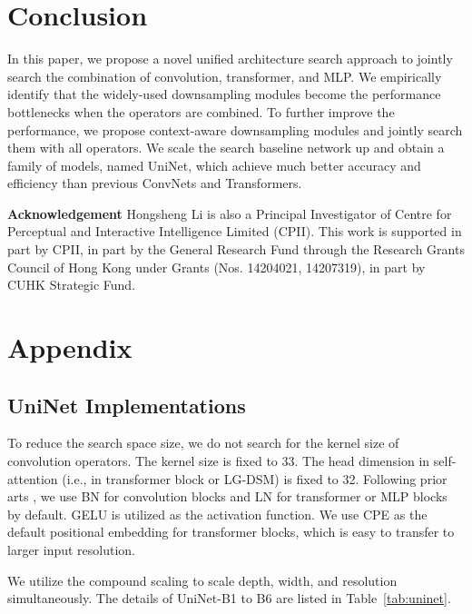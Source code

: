 \documentclass[runningheads]{llncs}
\begin{document}
\section{Conclusion}
\label{conclusion}

In this paper, we propose a novel unified architecture search approach to jointly search the combination of convolution, transformer, and MLP. We empirically identify that the widely-used downsampling modules become the performance bottlenecks when the operators are combined. To further improve the performance, we propose context-aware downsampling modules and jointly search them with all operators. We scale the search baseline network up and obtain a family of models, named UniNet, which achieve much better accuracy and efficiency than previous ConvNets and Transformers.



\textbf{Acknowledgement}
Hongsheng Li is also a Principal Investigator of Centre for Perceptual and Interactive Intelligence Limited (CPII). This work is supported in part by CPII, in part by the General Research Fund through the Research Grants Council of Hong Kong under Grants (Nos. 14204021, 14207319), in part by CUHK Strategic Fund.

\section{Appendix}

\subsection{UniNet Implementations}
To reduce the search space size, we do not search for the kernel size of convolution operators. The kernel size is fixed to 33. The head dimension in self-attention (i.e., in transformer block or LG-DSM) is fixed to 32. Following prior arts \cite{resnet,vit}, we use BN \cite{bn} for convolution blocks and LN \cite{ln} for transformer or MLP blocks by default. GELU \cite{gelu} is utilized as the activation function. We use CPE \cite{cpe} as the default positional embedding for transformer blocks, which is easy to transfer to larger input resolution.

We utilize the compound scaling \cite{efficientnet} to scale depth, width, and resolution simultaneously. The details of UniNet-B1 to B6 are listed in Table~\ref{tab:uninet}.
\end{document}
